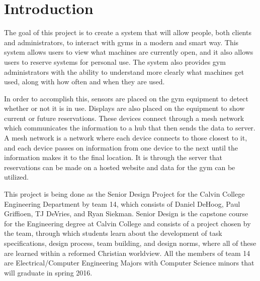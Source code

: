 \documentclass[PPFS.tex]{template/subfiles}
\begin{document}
\section{Introduction}

The goal of this project is to create a system that will allow people, both clients and administrators, to interact with gyms in a modern and smart way. This system allows users to view what machines are currently open, and it also allows users to reserve systems for personal use. The system also provides gym administrators with the ability to understand more clearly what machines get used, along with how often and when they are used.

In order to accomplish this, sensors are placed on the gym equipment to detect whether or not it is in use. Displays are also placed on the equipment to show current or future reservations. These devices connect through a mesh network which communicates the information to a hub that then sends the data to server. A mesh network is a network where each device connects to those closest to it, and each device passes on information from one device to the next until the information makes it to the final location. It is through the server that reservations can be made on a hosted website and data for the gym can be utilized.

This project is being done as the Senior Design Project for the Calvin College Engineering Department by team 14, which consists of Daniel DeHoog, Paul Griffioen, TJ DeVries, and Ryan Siekman. Senior Design is the capstone course for the Engineering degree at Calvin College and consists of a project chosen by the team, through which students learn about the development of task specifications, design process, team building, and design norms, where all of these are learned within a reformed Christian worldview. All the members of team 14 are Electrical/Computer Engineering Majors with Computer Science minors that will graduate in spring 2016.
\end{document}
